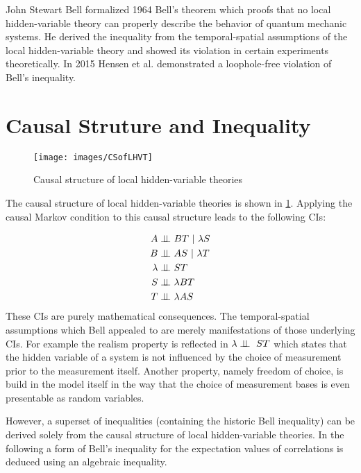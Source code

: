John Stewart Bell formalized 1964 \cite{Bell.1964} Bell's theorem which proofs that no local hidden-variable theory can properly describe the behavior of quantum mechanic systems.
He derived the inequality from the temporal-spatial assumptions of the local hidden-variable theory and showed its violation in certain experiments theoretically.
In 2015 Hensen et al. \cite{Hensen.2015} demonstrated a loophole-free violation of Bell's inequality.

\section{Causal Struture and Inequality}
\label{Basics:CausalStructure}

\begin{figure}[t!]
\centering
\texttt{[image: images/CSofLHVT]}
\caption{Causal structure of local hidden-variable theories}
\label{fig:CSofLHVT}
\end{figure}

The causal structure of local hidden-variable theories is shown in \ref{fig:CSofLHVT}.
Applying the causal Markov condition to this causal structure leads to the following \acp{CI}:

\begin{equation}
\begin{aligned}
A\independent&\ BT\ |\ \lambda S
\\
B\independent&\ AS\ |\ \lambda T
\\
\lambda\independent&\ ST
\\
S\independent&\ \lambda BT
\\
T\independent&\ \lambda AS
\end{aligned}
\end{equation}
These \acp{CI} are purely mathematical consequences.
The temporal-spatial assumptions which Bell appealed to are merely manifestations of those underlying \acp{CI}.
For example the realism property is reflected in $\lambda\perp\!\!\!\perp\ ST$ which states that the hidden variable of a system is not influenced by the choice of measurement prior to the measurement itself.
Another property, namely freedom of choice, is build in the model itself in the way that the choice of measurement bases is even presentable as random variables.

However, a superset of inequalities (containing the historic Bell inequality) can be derived solely from the causal structure of local hidden-variable theories.
In the following a form of Bell's inequality for the expectation values of correlations is deduced using an algebraic inequality.

